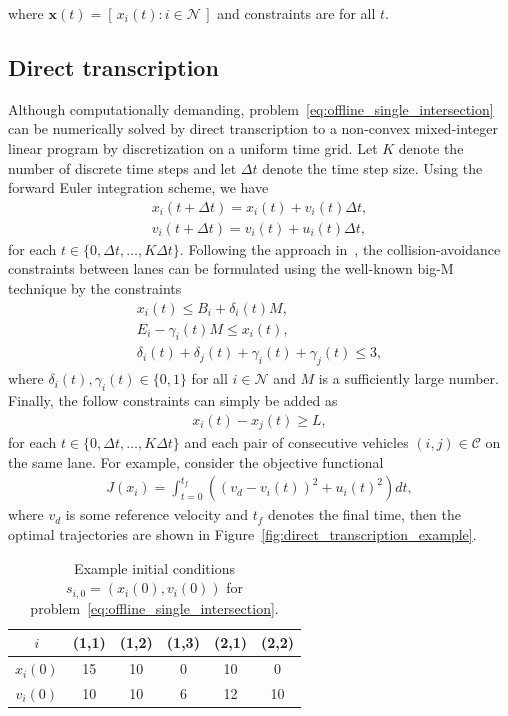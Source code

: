 \documentclass[a4paper]{article}
\theoremstyle{definition}
\theoremstyle{plain}
\begin{document}
where $\mathbf{x}(t) = [\, x_{i}(t) : i \in \mathcal{N} \,]$ and constraints are
for all $t$.


\subsection{Direct transcription}

Although computationally demanding,
problem~\eqref{eq:offline_single_intersection} can be numerically solved by
direct transcription to a non-convex mixed-integer linear program by
discretization on a uniform time grid. Let $K$ denote the number of discrete
time steps and let $\Delta t$ denote the time step size.
%
Using the forward Euler integration scheme, we have
\begin{align*}
  x_{i}(t + \Delta t) = x_{i}(t) + v_{i}(t) \Delta t , \\
  v_{i}(t + \Delta t) = v_{i}(t) + u_{i}(t) \Delta t ,
\end{align*}
for each $t \in \{0, \Delta t, \dots, K \Delta t\}$. Following the approach
in~\cite{hultApproximateSolutionOptimal2015}, the collision-avoidance
constraints between lanes can be formulated using the well-known big-M technique
by the constraints
\begin{align*}
  x_{i}(t) \leq B_{i} + \delta_{i}(t) M , \\
  E_{i} - \gamma_{i}(t) M \leq x_{i}(t) , \\
  \delta_{i}(t) + \delta_{j}(t) + \gamma_{i}(t) + \gamma_{j}(t) \leq 3 ,
\end{align*}
where $\delta_{i}(t), \gamma_{i}(t) \in \{ 0, 1 \}$ for all $i \in \mathcal{N}$ and $M$ is a
sufficiently large number.
%
Finally, the follow constraints can simply be added as
\begin{align*}
  x_{i}(t) - x_{j}(t) \geq L ,
\end{align*}
for each $t \in \{0, \Delta t, \dots, K \Delta t\}$ and each pair of consecutive
vehicles $(i, j) \in \mathcal{C}$ on the same lane.
%
For example, consider the objective functional
\begin{align*}
  J(x_{i}) = \int_{t=0}^{t_{f}} \left( {(v_{d} - v_{i}(t))}^{2} + {u_{i}(t)}^{2} \right) dt ,
\end{align*}
where $v_{d}$ is some reference velocity and $t_{f}$ denotes the final time,
then the optimal trajectories are shown in
Figure~\ref{fig:direct_transcription_example}.

\begin{table}[H]
  \centering
\begin{tabular}{ c | c c c | c c }
  $i$  & {\color{armygreen}(1,1)} & {\color{armygreen}(1,2)} & {\color{armygreen}(1,3)} & {\color{red}(2,1)} & {\color{red}(2,2)} \\
  \hline
  $x_{i}(0)$ & 15 & 10 &  0 & 10 &  0 \\
  $v_{i}(0)$ & 10 & 10 &  6 & 12 & 10 \\
\end{tabular}
\caption{Example initial conditions $s_{i,0} = (x_{i}(0), v_{i}(0))$ for
  problem~\eqref{eq:offline_single_intersection}.}
\label{tab:hult_parameters}
\end{table}
\end{document}
